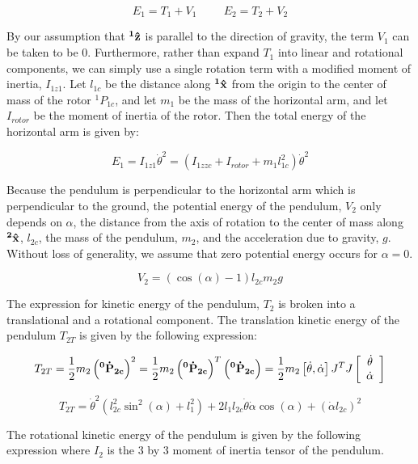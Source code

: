 \documentclass{article}
\theoremstyle{plain}
\theoremstyle{definition}
\theoremstyle{remark}
\begin{document}
$$ E_{1} = T_{1} + V_{1} \hspace{1cm} E_{2} = T_{2} + V_{2} $$

By our assumption that $\bf{^1\hat{z}}$ is parallel to the direction of gravity, the term $V_{1}$ can be taken to be 0.  Furthermore, rather than expand $T_{1}$ into linear and rotational components, we can simply use a single rotation term with a modified moment of inertia, $I_{1z1}$.  Let $l_{1c}$ be the distance along $\bf{^1\hat{x}}$ from the origin to the center of mass of the rotor $^1P_{1c}$, and let $m_{1}$ be the mass of the horizontal arm, and let $I_{rotor}$ be the moment of inertia of the rotor. Then the total energy of the horizontal arm is given by:

$$ E_{1} = I_{1z1} \dot{\theta}^2 = \left( I_{1zzc} + I_{rotor} + m_{1} l_{1c}^2 \right) \dot{\theta}^2$$

Because the pendulum is perpendicular to the horizontal arm which is perpendicular to the ground, the potential energy of the pendulum, $V_{2}$ only depends on $\alpha$, the distance from the axis of rotation to the center of mass along $\bf{^2\hat{x}}$, $l_{2c}$, the mass of the pendulum, $m_{2}$, and the acceleration due to gravity, $g$.  Without loss of generality, we assume that zero potential energy occurs for $\alpha = 0$.

$$ V_{2} = \left( \cos(\alpha) - 1 \right) l_{2c} m_2 g $$

The expression for kinetic energy of the pendulum, $T_{2}$ is broken into a translational and a rotational component.  The translation kinetic energy of the pendulum $T_{2T}$ is given by the following expression: 

$$ T_{2T} = \frac{1}{2} m_{2} \left( \bf{^0\dot{P}_{2c}} \right)^2 = \frac{1}{2} m_{2} \left( \bf{^0\dot{P}_{2c}} \right)^T\left( \bf{^0\dot{P}_{2c}} \right) = \frac{1}{2} m_{2} \left[ \dot{\theta}, \dot{\alpha} \right] J^T J \left[ \begin{array}{c l} \dot{\theta} \\ \dot{\alpha} \end{array} \right] $$

$$ T_{2T} = \dot{\theta}^2 \left( l_{2c}^2  \sin^2(\alpha)  + l_{1}^2 \right) + 2 l_{1} l_{2c} \dot{\theta} \dot{\alpha} \cos(\alpha) + \left( \dot{\alpha} l_{2c} \right)^2 $$

The rotational kinetic energy of the pendulum is given by the following expression where $I_{2}$ is the 3 by 3 moment of inertia tensor of the pendulum. 
\end{document}
